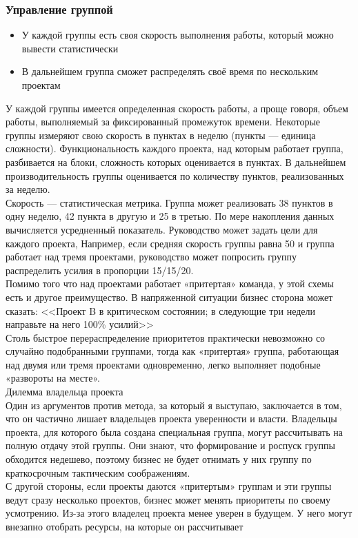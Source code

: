 \documentclass{../industrial-development}
\begin{document}
\begin{frame} \frametitle{Управление группой}
\begin{itemize}
  \item У каждой группы есть своя скорость выполнения работы, который можно вывести статистически
  \item В дальнейшем группа сможет распределять своё время по нескольким проектам
\end{itemize}
\end{frame}
\lecturenotes
У каждой группы имеется определенная скорость работы, а проще говоря, объем работы, выполняемый за фиксированный промежуток времени. Некоторые группы измеряют свою скорость в пунктах в неделю
(пункты — единица сложности). Функциональность каждого проекта, над которым работает группа, разбивается на блоки, сложность которых оценивается в пунктах. В дальнейшем производительность группы оценивается по количеству пунктов, реализованных за неделю.\\
Скорость — статистическая метрика. Группа может реализовать 38 пунктов в одну неделю, 42 пункта в другую и 25 в третью. По мере накопления данных вычисляется усредненный показатель. Руководство может задать цели для каждого проекта, Например, если средняя скорость группы равна 50 и группа работает над тремя проектами, руководство может попросить группу распределить усилия
в пропорции 15/15/20.\\
Помимо того что над проектами работает «притертая» команда, у этой схемы есть и другое преимущество. В напряженной ситуации бизнес сторона может сказать: <<Проект B в критическом состоянии; в следующие три недели направьте на него 100\% усилий>>\\
Столь быстрое перераспределение приоритетов практически невозможно со случайно подобранными группами, тогда как «притертая» группа, работающая над двумя или тремя проектами одновременно, легко выполняет подобные «развороты на месте».\\
Дилемма владельца проекта\\
Один из аргументов против метода, за который я выступаю, заключается в том, что он частично лишает владельцев проекта уверенности и власти. Владельцы проекта, для которого была создана специальная группа, могут рассчитывать на полную отдачу этой группы. Они знают, что формирование и роспуск группы обходится недешево, поэтому бизнес не будет отнимать у них группу по краткосрочным тактическим соображениям.\\
С другой стороны, если проекты даются «притертым» группам и эти группы ведут сразу несколько проектов, бизнес может менять приоритеты по своему усмотрению. Из-за этого владелец проекта менее уверен в будущем. У него могут внезапно отобрать ресурсы, на которые он рассчитывает
\end{document}

